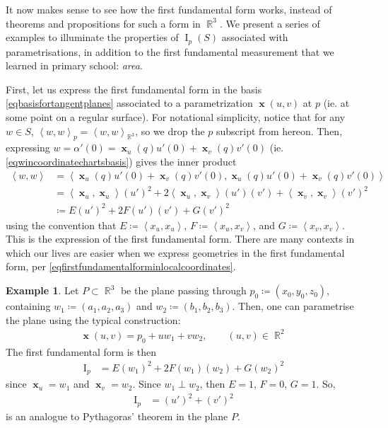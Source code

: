 \documentclass{amsart} %
\theoremstyle{mytheoremstyle}
\theoremstyle{definition}
\newtheorem{example}[definition]{Example}
\numberwithin{equation}{section}
\DeclareMathOperator{\R}{\mathbb{R}}
\DeclareMathOperator{\I}{I}
\DeclareMathOperator{\1}{\mathbbm{1}}
\DeclareMathOperator{\x}{\mathbf{x}}
\newcommand{\innerproduct}[2]{\left\langle #1,#2 \right\rangle}
\begin{document}
It now makes sense to see how the first fundamental form works, instead of theorems and propositions for such a form in $\R^3$. We present a series of examples to illuminate the properties of $\I_p (S)$ associated with parametrisations, in addition to the first fundamental measurement that we learned in primary school: \textit{area}.

First, let us express the first fundamental form in the basis \eqref{eqbasisfortangentplanes} associated to a parametrization $\x(u,v)$ at $p$ (ie. at some point on a regular surface). For notational simplicity, notice that for any $w \in S$, $\innerproduct{w}{w}_p = \innerproduct{w}{w}_{\R^3}$, so we drop the $p$ subscript from hereon. Then, expressing $w = \alpha'(0) = \x_u (q) u'(0) + \x_v (q) v'(0)$ (ie. \eqref{eqwincoordinatechartsbasis}) gives the inner product
\begin{align}
	\nonumber \innerproduct{w}{w} &= \innerproduct{\x_u (q) u'(0) + \x_v (q) v'(0)}{\x_u (q) u'(0) + \x_v (q) v'(0)} \\
	\nonumber &= \innerproduct{\x_u}{\x_u} (u')^2 + 2 \innerproduct{\x_u}{\x_v} (u')(v') + \innerproduct{\x_v}{\x_v} (v')^2 \\
	\label{eqfirstfundamentalforminlocalcoordinates} &\coloneqq E (u')^2 + 2 F (u')(v') + G (v')^2
\end{align}
using the convention that $E \coloneqq \innerproduct{x_u}{x_u}$, $F \coloneqq \innerproduct{x_u}{x_v} $, and $G \coloneqq \innerproduct{x_v}{x_v} $. This is the expression of the first fundamental form. There are many contexts in which our lives are easier when we express geometries in the first fundamental form, per \eqref{eqfirstfundamentalforminlocalcoordinates}.

\begin{example}
	\label{exampleplanepassingthroughp0}
	Let $P \subset \R^3$ be the plane passing through $p_0 \coloneqq (x_0,y_0,z_0)$, containing $w_1 \coloneqq (a_1,a_2,a_3)$ and $w_2 \coloneqq (b_1,b_2,b_3)$. Then, one can parametrise the plane using the typical construction:
	\begin{align*}
	\x(u,v) = p_0 + u w_1 + v w_2, \qquad (u,v) \in \R^2
	\end{align*}
	The first fundamental form is then
	\begin{align*}
		\I_p &= E (w_1)^2 + 2 F (w_1)(w_2) + G (w_2)^2
	\end{align*}
	since $\x_u = w_1$ and $\x_v = w_2$. Since $w_1 \perp w_2$, then $E=1$, $F=0$, $G=1$. So,
	\begin{align*}
		\I_p &=  (u')^2 + (v')^2
	\end{align*}
	is an analogue to Pythagoras' theorem in the plane $P$.
\end{example}
\end{document}
